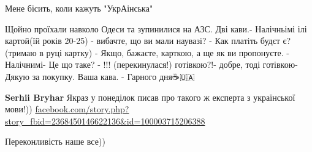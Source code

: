 \begin{itemize}
 
Мене бісить, коли кажуть "УкрАінська"

 

Щойно проїхали навколо Одеси та зупинилися на АЗС. Дві кави.- Налічньімі ілі
картой(їй років 20-25) - вибачте, що ви мали наувазі? - Как платіть будєт є?
(тримаю в руці картку) - Якщо, бажаєте, карткою, а ще як ви пропонуєте. -
Налічнимі- Це що таке? - !!! (перекинулася!) готівкою?!- добре, тоді готівкою-
Дякую за покупку. Ваша кава. - Гарного дня☕️🇺🇦


 
\textbf{Serhii Bryhar}
Якраз у понеділок писав про такого ж експерта з української мови!))
\url{facebook.com/story.php?story_fbid=2368450146622136&id=100003715206388}

 
Переконливість наше все))

 


\end{itemize}
